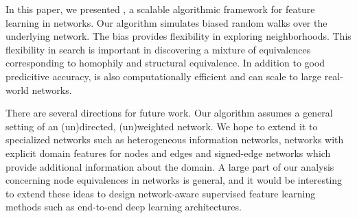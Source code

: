 



In this paper, we presented \nodevec, a scalable algorithmic framework for feature learning in networks. Our algorithm simulates biased random walks over the underlying network. The bias provides flexibility in exploring neighborhoods. This flexibility in search is important in discovering a mixture of equivalences corresponding to homophily and structural equivalence. In addition to good predicitive accuracy, \nodevec is also computationally efficient and can scale to large real-world networks.

There are several directions for future work. Our algorithm assumes a general setting of an (un)directed, (un)weighted network. We hope to extend it to specialized networks such as heterogeneous information networks, networks with explicit domain features for nodes and edges and signed-edge networks which provide additional information about the domain. A large part of our analysis concerning node equivalences in networks is general, and it would be interesting to extend these ideas to design network-aware supervised feature learning methods such as end-to-end deep learning architectures.

